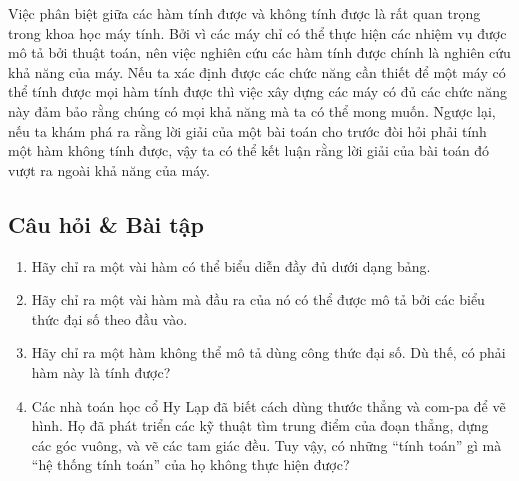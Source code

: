 Việc phân biệt giữa các hàm tính được và không tính được là rất quan trọng trong khoa học
máy tính. Bởi vì các máy chỉ có thể thực hiện các nhiệm vụ được mô tả bởi thuật toán, nên
việc nghiên cứu các hàm tính được chính là nghiên cứu khả năng của máy. Nếu ta xác định
được các chức năng cần thiết để một máy có thể tính được mọi hàm tính được thì việc xây
dựng các máy có đủ các chức năng này đảm bảo rằng chúng có mọi khả năng mà ta có thể mong
muốn. Ngược lại, nếu ta khám phá ra rằng lời giải của một bài toán cho trước đòi hỏi phải
tính một hàm không tính được, vậy ta có thể kết luận rằng lời giải của bài toán đó vượt ra
ngoài khả năng của máy.

\subsection*{Câu hỏi \& Bài tập}
\begin{enumerate}
\item Hãy chỉ ra một vài hàm có thể biểu diễn đầy đủ dưới dạng bảng.

\item Hãy chỉ ra một vài hàm mà đầu ra của nó có thể được mô tả bởi các biểu thức đại số
  theo đầu vào.

\item Hãy chỉ ra một hàm không thể mô tả dùng công thức đại số. Dù thế, có phải hàm này là
  tính được?

\item Các nhà toán học cổ Hy Lạp đã biết cách dùng thước thẳng và com-pa để vẽ hình. Họ đã
  phát triển các kỹ thuật tìm trung điểm của đoạn thẳng, dựng các góc vuông, và vẽ các tam
  giác đều. Tuy vậy, có những ``tính toán'' gì mà ``hệ thống tính toán'' của họ không thực
  hiện được?
\end{enumerate}


